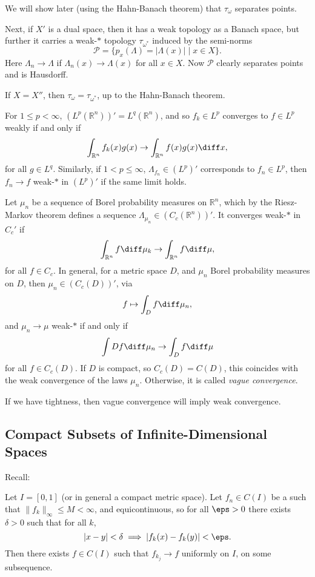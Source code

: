 \documentclass[12pt]{article}
\begin{document}
We will show later (using the Hahn-Banach theorem) that $\tau_{\omega}$ separates points.

Next, if $X'$ is a dual space, then it has a weak topology as a Banach space, but further it carries a weak-$\ast$ topology $\tau_{\omega^{\ast}}$ induced by the semi-norms
\[
	\mathcal{P} = \{p_x(\Lambda) = |\Lambda(x)| \mid x \in X\}.
\]
Here $\Lambda_n \to \Lambda$ if $\Lambda_n(x) \to \Lambda(x)$ for all $x \in X$. Now $\mathcal{P}$ clearly separates points and is Hausdorff.

If $X = X''$, then $\tau_\omega = \tau_{\omega^{\ast}}$, up to the Hahn-Banach theorem.

\begin{exbox}
	For $1 \leq p < \infty$, $(L^p(\mathbb{R}^n))' = L^q(\mathbb{R}^n)$, and so $f_k \in L^p$ converges to $f \in L^p$ weakly if and only if
	\[
	\int_{\mathbb{R}^n} f_k(x) g(x) \to \int_{\mathbb{R}^n} f(x) g(x) \diff x,
	\]
	for all $g \in L^q$. Similarly, if $1 < p \leq \infty$, $\Lambda_{f_n} \in (L^p)'$ corresponds to $f_n \in L^p$, then $f_n \to f$ weak-$\ast$ in $(L^p)'$ if the same limit holds.

	Let $\mu_n$ be a sequence of Borel probability measures on $\mathbb{R}^n$, which by the Riesz-Markov theorem defines a sequence $\Lambda_{\mu_n} \in (C_c(\mathbb{R}^n))'$. It converges weak-$\ast$ in $C_c'$ if
	\[
	\int_{\mathbb{R}^n} f \diff \mu_k \to \int_{\mathbb{R}^n} f \diff \mu,
	\]
	for all $f \in C_c$. In general, for a metric space $D$, and $\mu_n$ Borel probability measures on $D$, then $\mu_n \in (C_c(D))'$, via
	\[
	f \mapsto \int_D f \diff \mu_n,
	\]
	and $\mu_n \to \mu$ weak-$\ast$ if and only if
	\[
	\int D f \diff \mu_n \to \int_D f \diff \mu
	\]
	for all $f \in C_c(D)$. If $D$ is compact, so $C_c(D) = C(D)$, this coincides with the weak convergence of the laws $\mu_n$. Otherwise, it is called \emph{vague convergence}.

	If we have tightness, then vague convergence will imply weak convergence.
\end{exbox}

\subsection{Compact Subsets of Infinite-Dimensional Spaces}
\label{sub:comp_inf}

Recall:

\begin{theorem}
	Let $I = [0, 1]$ (or in general a compact metric space). Let $f_n \in C(I)$ be a such that $\|f_k\|_\infty \leq M < \infty$, and equicontinuous, so for all $\eps > 0$ there exists $\delta > 0$ such that for all $k$,
	\[
	|x - y| < \delta \implies |f_k(x) - f_k(y)| < \eps.
	\]
	Then there exists $f \in C(I)$ such that $f_{k_j} \to f$ uniformly on $I$, on some subsequence.
\end{theorem}
\end{document}
